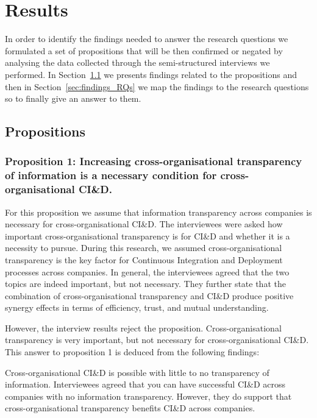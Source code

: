 \section{Results}\label{sec:results}

In order to identify the findings needed to answer the research questions we formulated a set of propositions that will be then confirmed or negated by analysing the data collected through the semi-structured interviews we performed. In Section~\ref{sec:propositions} we presents findings related to the propositions and then in Section~\ref{sec:findings_RQs} we map the findings to the research questions so to finally give an answer to them.

\subsection{Propositions}\label{sec:propositions}

\subsubsection{Proposition 1: Increasing cross-organisational transparency of information is a necessary condition for cross-organisational CI\&D.}

For this proposition we assume that information transparency across companies is necessary for cross-organisational CI\&D. The interviewees were asked how important cross-organisational transparency is for CI\&D and whether it is a necessity to pursue. During this research, we assumed cross-organisational transparency is the key factor for Continuous Integration and Deployment processes across companies. In general, the interviewees agreed that the two topics are indeed important, but not necessary. They further state that the combination of cross-organisational transparency and CI\&D produce positive synergy effects in terms of efficiency, trust, and mutual understanding.

However, the interview results reject the proposition. Cross-organisational transparency is very important, but not necessary for cross-organisational CI\&D. This answer to proposition 1 is deduced from the following findings:

 Cross-organisational CI\&D is possible with little to no transparency of information. Interviewees agreed that you can have successful CI\&D across companies with no information transparency. However, they do support that cross-organisational transparency benefits CI\&D across companies.

